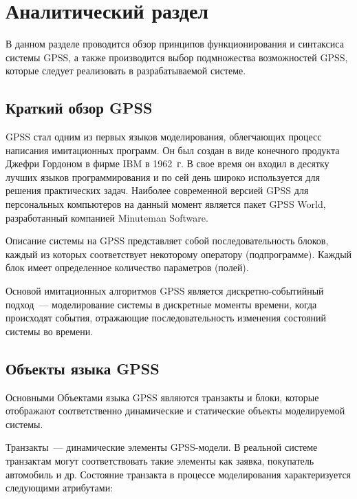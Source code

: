 \chapter{Аналитический раздел}
\label{cha:analysis}

В данном разделе проводится обзор принципов функционирования и синтаксиса системы GPSS, а также производится выбор подмножества возможностей GPSS, которые следует реализовать в разрабатываемой системе.

\section{Краткий обзор GPSS}

GPSS стал одним из первых языков моделирования, облегчающих процесс написания имитационных программ. Он был создан в виде конечного продукта Джефри Гордоном в фирме IBM в 1962~г.\cite{ImitGPSS} В свое время он входил в десятку лучших языков программирования и по сей день широко используется для решения практических задач. Наиболее современной версией GPSS для персональных компьютеров на данный момент является пакет GPSS World, разработанный компанией Minuteman Software.

Описание системы на GPSS представляет собой последовательность блоков,
каждый из которых соответствует некоторому оператору (подпрограмме). Каждый блок
имеет определенное количество параметров (полей).


Основой имитационных алгоритмов GPSS является дискретно-событийный подход~--- моделирование системы в дискретные моменты времени, когда происходят события, отражающие последовательность изменения состояний системы во времени.\cite{ImitGPSS}

\section{Объекты языка GPSS}

Основными Объектами языка GPSS являются транзакты и блоки, которые отображают соответственно динамические и статические объекты моделируемой системы.

Транзакты~--- динамические элементы GPSS-модели. В реальной системе транзактам могут соответствовать такие элементы как заявка, покупатель автомобиль и др. Состояние транзакта в процессе моделирования характеризуется следующими атрибутами:


